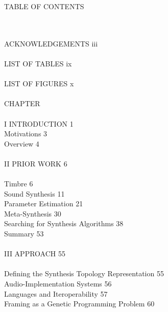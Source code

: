 \documentclass[12pt]{report} 	%
\numberwithin{figure}{chapter}
\numberwithin{table}{chapter}
\numberwithin{equation}{chapter}
\begin{document}

\begingroup
\begin{center}
    \fontsize{14pt}{17pt}\selectfont
    TABLE OF CONTENTS
\end{center}
\endgroup
\vspace{36pt}
\\
\\
\noindent ACKNOWLEDGEMENTS \hfill iii
\\
\\
LIST OF TABLES \hfill ix
\\
\\
LIST OF FIGURES \hfill x
\\
\\
CHAPTER
\\
\\
\indent \indent I \indent INTRODUCTION \hfill 1
\\
\indent \indent \indent \indent Motivations \hfill 3
\\
\indent \indent \indent \indent Overview \hfill 4
\\
\\
\indent \indent II \hspace{11pt} PRIOR WORK \hfill 6
\\
\\
\indent \indent \indent \indent Timbre \hfill 6
\\
\indent \indent \indent \indent Sound Synthesis \hfill 11
\\
\indent \indent \indent \indent Parameter Estimation \hfill 21
\\
\indent \indent \indent \indent Meta-Synthesis \hfill 30
\\
\indent \indent \indent \indent \indent Searching for Synthesis Algorithms \hfill 38 \\
\indent \indent \indent \indent Summary \hfill 53
\\
\\
\indent \indent III \hspace{6pt}  APPROACH \hfill 55
\\
\\
\indent \indent \indent \indent Defining the Synthesis Topology Representation \hfill 55
\\
\indent \indent \indent \indent \indent Audio-Implementation Systems \hfill 56
\\
\indent \indent \indent \indent \indent Languages and Iteroperability \hfill 57
\\
\indent \indent \indent \indent \indent Framing as a Genetic Programming Problem \hfill 60
\end{document}
